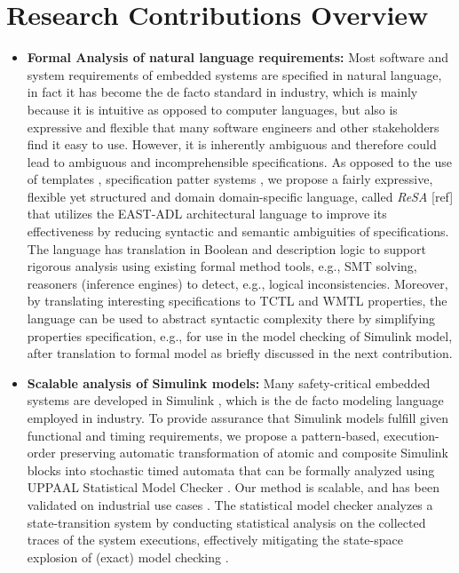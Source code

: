 \section{Research Contributions Overview}
\begin{itemize}
    \item \textbf{Formal Analysis of natural language requirements: } Most software and system requirements \cite{ieereqspecstandard} of embedded systems are specified in natural language, in fact it has become the de facto standard in industry, which is mainly because it is intuitive as opposed to computer languages, but also is expressive and flexible that many software engineers and other stakeholders find it easy to use. However, it is inherently ambiguous and therefore could lead to ambiguous and incomprehensible specifications. 
    As opposed to the use of templates \cite{Hull2011RequirementsEngineering}, specification patter systems\cite{Gruhn2006PatternsSpecifications,Konrad2005Real-timePatterns} , we propose a fairly expressive, flexible yet structured and domain domain-specific language, called \textit{ReSA} [ref] that utilizes the EAST-ADL architectural language to improve its effectiveness by reducing syntactic and semantic ambiguities of specifications. The language has translation in Boolean and description logic to support rigorous analysis using existing formal method tools, e.g., SMT solving, reasoners (inference engines) to detect, e.g., logical inconsistencies. Moreover, by translating interesting specifications to TCTL and WMTL properties, the language can be used to abstract syntactic complexity there by simplifying properties specification, e.g., for use in the model checking of Simulink model, after translation to formal model as briefly discussed  in the next contribution.
    \item \textbf{Scalable analysis of Simulink models: }
    Many safety-critical embedded systems are developed in Simulink \cite{JamesB.Dabney2003MasteringSimulink}, which is the de facto modeling language employed in industry.  To provide assurance that Simulink models fulfill given functional and timing requirements, we propose a pattern-based, execution-order preserving automatic transformation of atomic and composite Simulink blocks into stochastic timed automata that can be formally analyzed using UPPAAL Statistical Model Checker \cite{Bulychev2012UPPAAL-SMC:Automata}. Our method is scalable, and has been validated on industrial use cases \cite{Filipovikj2016SimulinkSystems}. The statistical model checker analyzes a state-transition system by conducting statistical analysis on the collected traces of the system executions, effectively mitigating the state-space explosion of (exact) model checking \cite{Legay2010StatisticalOverview}. 


\end{itemize}
